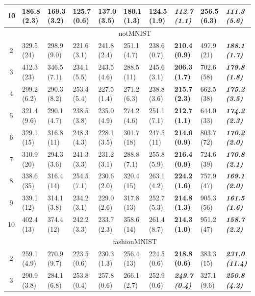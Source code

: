 \begin{table}[!h]
\begin{adjustbox}{max width=1\textwidth}{}
\begin{tabular}{@{}c|lllllll|ll@{}}
10 & 186.8 (2.3)  & 169.3 (3.2)  & 125.7 (0.6) & 137.0 (3.5) & 180.1 (1.3) & 124.5 (1.9) & \textbf{\textit{112.7 (1.1)}} & 256.5 (6.3) & \textit{\textbf{111.3 (5.6)}}   \\ \midrule
& \multicolumn{9}{c}{\multirow{2}{*}{notMNIST}}  \\
& \multicolumn{9}{c}{} \\\midrule
2  & 329.5 (24)   & 298.9 (9.0) & 221.6 (3.1) & 241.8 (2.4) & 251.1 (4.7) & 238.6 (0.7) & \textbf{210.4 (0.9)} & 497.9 (21) & \textit{\textbf{188.1 (1.7)}} \\
3  & 412.3 (23)   & 346.5 (7.1) & 234.1 (5.5) & 243.5 (4.6) & 288.5 (11)  & 245.6 (3.1) & \textbf{206.3 (1.7)} & 702.6 (58) & \textit{\textbf{179.8 (1.8)}} \\
4  & 299.2 (6.2)  & 290.3 (8.2) & 253.4 (5.4) & 227.5 (1.4) & 271.2 (6.3) & 238.8 (3.6) & \textbf{215.7 (2.3)} & 662.5 (38) & \textit{\textbf{175.2 (3.5)}} \\
5  & 321.4 (9.6)  & 290.1 (4.7) & 238.5 (3.8) & 235.0 (4.9) & 274.2 (4.6) & 251.1 (7.1) & \textbf{212.7 (1.1)} & 644.0 (33) & \textit{\textbf{174.2 (2.3)}} \\
6  & 329.1 (15)   & 316.8 (11)  & 248.3 (4.3) & 228.1 (3.5) & 301.7 (18)  & 247.5 (11)  & \textbf{214.6 (0.9)} & 803.7 (72) & \textit{\textbf{170.2 (2.0)}} \\
7  & 310.9 (20)   & 294.3 (3.6) & 241.3 (3.3) & 231.2 (3.1) & 288.8 (7.1) & 255.8 (5.9) & \textbf{216.4 (0.9)} & 724.6 (39) & \textit{\textbf{170.8 (2.1)}} \\
8  & 338.6 (35)   & 316.4 (14)  & 254.5 (7.1) & 230.6 (2.0) & 320.4 (15)  & 263.1 (4.2) & \textbf{224.2 (1.6)} & 757.9 (47) & \textit{\textbf{169.1 (2.0)}} \\
9  & 339.1 (12)   & 314.1 (3.8) & 234.2 (3.1) & 229.0 (2.6) & 317.8 (13)  & 252.7 (5.3) & \textbf{214.8 (1.3)} & 905.3 (56) & \textit{\textbf{161.5 (1.6)}} \\
10 & 402.4 (13)   & 374.4 (12)  & 242.2 (3.3) & 233.7 (2.3) & 358.6 (14)  & 261.4 (8.7) & \textbf{214.3 (1.0)} & 951.2 (47) & \textit{\textbf{158.7 (2.2)}}  \\ \midrule
& \multicolumn{9}{c}{\multirow{2}{*}{fashionMNIST}}  \\
& \multicolumn{9}{c}{} \\\midrule
2  & 259.1 (4.9)& 270.9 (9.7) & 223.5 (0.6) & 230.3 (1.3) & 256.4 (13)  & 224.5 (0.6) & \textbf{218.8 (0.6)}          & 383.3 (15)  & \textit{\textbf{231.0 (11.4)}} \\
3  & 290.9 (3.8)& 284.1 (6.8) & 253.8 (0.4) & 257.8 (0.6) & 266.1 (2.7) & 252.9 (0.6) & \textbf{\textit{249.7 (0.4)}} & 327.1 (9.6) & \textit{\textbf{250.8 (4.2)}}  \\

\end{tabular}
\end{adjustbox}
\end{table}
